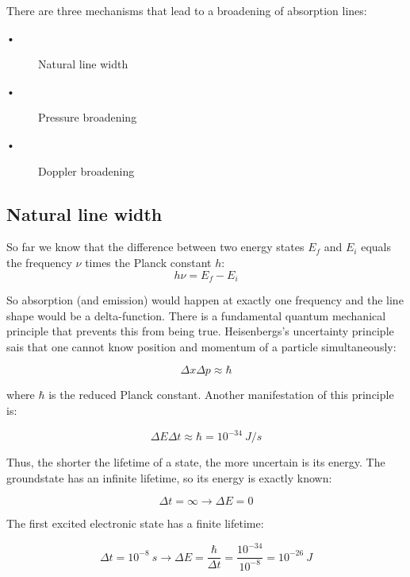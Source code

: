 \documentclass[a4paper,fleqn]{article}
\begin{document}
There are three mechanisms that lead to a broadening of absorption lines:
\begin{description}
\item[•] Natural line width
\item[•] Pressure broadening
\item[•] Doppler broadening 
\end{description}

\subsection{Natural line width}

So far we know that the difference between two energy states $E_{f}$ and $E_{i}$ equals the frequency $\nu$ times the Planck constant $h$:
\begin{equation}
h \nu = E_f - E_i
\end{equation}

So absorption (and emission) would happen at exactly one frequency and the line shape would be a delta-function. There is a fundamental quantum mechanical principle that prevents this from being true. Heisenbergs's uncertainty principle sais that one cannot know position and momentum of a particle simultaneously: 

\begin{equation}
\Delta x \Delta p \approx \hbar
\end{equation}

where $\hbar$ is the reduced Planck constant. Another manifestation of this principle is:

\begin{equation}
\Delta E \Delta t \approx \hbar = 10^{-34}~J/s
\end{equation}

Thus, the shorter the lifetime of a state, the more uncertain is its energy. 
The groundstate has an infinite lifetime, so its energy is exactly known:

\begin{equation}
\Delta t = \infty \rightarrow \Delta E = 0
\end{equation}

The first excited electronic state has a finite lifetime:

\begin{equation}
\Delta t = 10^{-8}~s \rightarrow \Delta E = \frac{\hbar}{\Delta t} = \frac{10^{-34}}{10^{-8}} = 10^{-26}~J
\end{equation}
\end{document}
